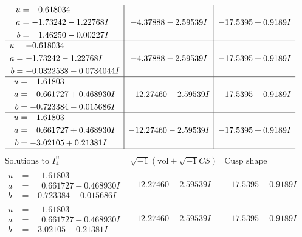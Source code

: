\documentclass[1p]{elsarticle_modified}
\theoremstyle{definition}
\newcommand{\I}{\sqrt{-1}}
\begin{document}
$$\begin{array}{c|c|c}
\begin{aligned}
u &= -0.618034\phantom{ +0.000000I} \\
a &= -1.73242 - 1.22768 I \\
b &= \phantom{-}1.46250 - 0.00227 I\end{aligned}
 & -4.37888 - 2.59539 I & -17.5395 + 0.9189 I \\ \hline\begin{aligned}
u &= -0.618034\phantom{ +0.000000I} \\
a &= -1.73242 - 1.22768 I \\
b &= -0.0322538 - 0.0734044 I\end{aligned}
 & -4.37888 - 2.59539 I & -17.5395 + 0.9189 I \\ \hline\begin{aligned}
u &= \phantom{-}1.61803\phantom{ +0.000000I} \\
a &= \phantom{-}0.661727 + 0.468930 I \\
b &= -0.723384 - 0.015686 I\end{aligned}
 & -12.27460 - 2.59539 I & -17.5395 + 0.9189 I \\ \hline\begin{aligned}
u &= \phantom{-}1.61803\phantom{ +0.000000I} \\
a &= \phantom{-}0.661727 + 0.468930 I \\
b &= -3.02105 + 0.21381 I\end{aligned}
 & -12.27460 - 2.59539 I & -17.5395 + 0.9189 I\\
 \hline 
 \end{array}$$\newpage$$\begin{array}{c|c|c}  
\text{Solutions to }I^u_{4}& \I (\text{vol} + \sqrt{-1}CS) & \text{Cusp shape}\\
 \hline 
\begin{aligned}
u &= \phantom{-}1.61803\phantom{ +0.000000I} \\
a &= \phantom{-}0.661727 - 0.468930 I \\
b &= -0.723384 + 0.015686 I\end{aligned}
 & -12.27460 + 2.59539 I & -17.5395 - 0.9189 I \\ \hline\begin{aligned}
u &= \phantom{-}1.61803\phantom{ +0.000000I} \\
a &= \phantom{-}0.661727 - 0.468930 I \\
b &= -3.02105 - 0.21381 I\end{aligned}
 & -12.27460 + 2.59539 I & -17.5395 - 0.9189 I \\ \hline\begin{aligned}

\end{aligned}
\end{array}$$
\end{document}
